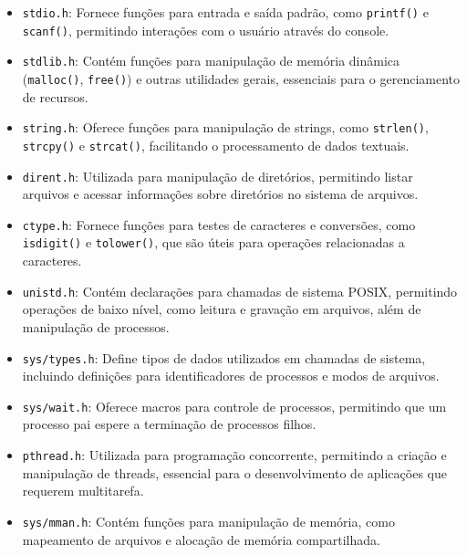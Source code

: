 \documentclass{article}
\begin{document}
\begin{itemize}
    \item \texttt{stdio.h}: Fornece funções para entrada e saída padrão, como \texttt{printf()} e \texttt{scanf()}, permitindo interações com o usuário através do console.
    
    \item \texttt{stdlib.h}: Contém funções para manipulação de memória dinâmica (\texttt{malloc()}, \texttt{free()}) e outras utilidades gerais, essenciais para o gerenciamento de recursos.
    
    \item \texttt{string.h}: Oferece funções para manipulação de strings, como \texttt{strlen()}, \texttt{strcpy()} e \texttt{strcat()}, facilitando o processamento de dados textuais.
    
    \item \texttt{dirent.h}: Utilizada para manipulação de diretórios, permitindo listar arquivos e acessar informações sobre diretórios no sistema de arquivos.
    
    \item \texttt{ctype.h}: Fornece funções para testes de caracteres e conversões, como \texttt{isdigit()} e \texttt{tolower()}, que são úteis para operações relacionadas a caracteres.
    
    \item \texttt{unistd.h}: Contém declarações para chamadas de sistema POSIX, permitindo operações de baixo nível, como leitura e gravação em arquivos, além de manipulação de processos.
    
    \item \texttt{sys/types.h}: Define tipos de dados utilizados em chamadas de sistema, incluindo definições para identificadores de processos e modos de arquivos.
    
    \item \texttt{sys/wait.h}: Oferece macros para controle de processos, permitindo que um processo pai espere a terminação de processos filhos.
    
    \item \texttt{pthread.h}: Utilizada para programação concorrente, permitindo a criação e manipulação de threads, essencial para o desenvolvimento de aplicações que requerem multitarefa.
    
    \item \texttt{sys/mman.h}: Contém funções para manipulação de memória, como mapeamento de arquivos e alocação de memória compartilhada.
    

\end{itemize}
\end{document}
